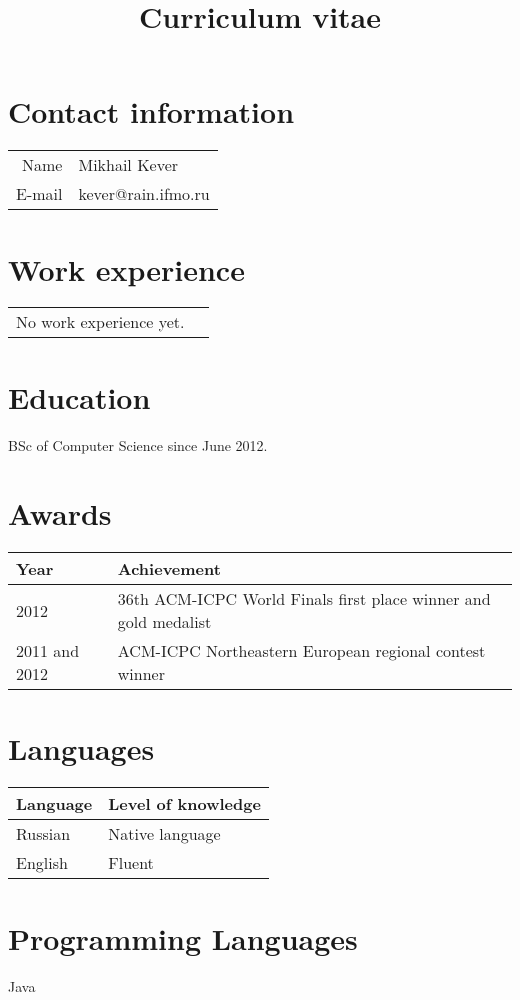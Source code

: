 \documentclass[11pt,a4paper,oneside]{article}
\begin{document}
\title{Curriculum vitae}
\date{}        
\maketitle

\section{Contact information}
\begin{center}
\begin{tabular}{r|l}
    Name&Mikhail Kever \\
    E-mail&kever@rain.ifmo.ru \\
\end{tabular}
\end{center}

\section{Work experience}
\begin{center}
\begin{tabular}{rl}
    No work experience yet.    
\end{tabular}
\end{center}

\section{Education}
    BSc of Computer Science since June 2012.

\section{Awards}
\begin{center}
    \begin{tabular}{l|l}
        Year&Achievement \\
        \hline
        2012&36th ACM-ICPC World Finals first place winner and gold medalist \\
        2011 and 2012&ACM-ICPC Northeastern European regional contest winner \\
    \end{tabular}
\end{center}

\section{Languages}
\begin{center}  
    \begin{tabular}{l|l}
        Language&Level of knowledge \\
        \hline
        Russian&Native language \\ 
        English&Fluent \\
    \end{tabular}
\end{center}

\section{Programming Languages}
    Java
\end{document}
